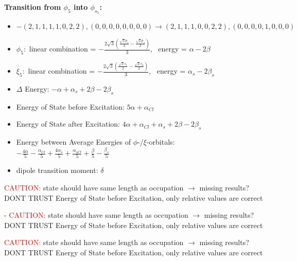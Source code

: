 \documentclass[12pt,a4paper]{article}
\begin{document}
        \noindent\textbf{Transition from $\phi_{5}$ into $\phi_{s_{5}}$:}
        \begin{itemize}
            \item $- (2, 1, 1, 1, 1, 0, 2, 2), (0, 0, 0, 0, 0, 0, 0, 0) \rightarrow (2, 1, 1, 1, 0, 0, 2, 2), (0, 0, 0, 0, 1, 0, 0, 0)$
        
            \item $\phi_{5}:$ linear combination = $- \frac{2 \sqrt{3} \left(\frac{\sqrt{2} p_{1}}{2} - \frac{\sqrt{2} p_{4}}{2}\right)}{3}$, \
            energy = $\alpha - 2 \beta$
            
            \item $\xi_{5}:$ linear combination = $- \frac{2 \sqrt{3} \left(\frac{\sqrt{2} s_{1}}{2} - \frac{\sqrt{2} s_{4}}{2}\right)}{3}$, \
            energy = $\alpha_{s} - 2 \beta_{s}$
            
            \item $\Delta$ Energy: $- \alpha + \alpha_{s} + 2 \beta - 2 \beta_{s}$
            \item Energy of State before Excitation: $5 \alpha + \alpha_{Cl}$
            \item Energy of State after Excitation: $4 \alpha + \alpha_{Cl} + \alpha_{s} + 2 \beta - 2 \beta_{s}$
            \item Energy between Average Energies of $\phi$-/$\xi$-orbitals: \
            $- \frac{4 \alpha}{5} - \frac{\alpha_{Cl}}{5} + \frac{4 \alpha_{s}}{5} + \frac{\alpha_{s Cl}}{5} + \frac{\beta}{5} - \frac{\beta_{s}}{5}$
        
            \item dipole transition moment: $\delta$
        
        \end{itemize}
        
	\textcolor{red}{CAUTION:} state should have same length as occupation $\rightarrow$ missing results?
	DONT TRUST \glqq{}Energy of State before Excitation\grqq{}, only relative values are correct

 - 	\textcolor{red}{CAUTION:} state should have same length as occupation $\rightarrow$ missing results?
	DONT TRUST \glqq{}Energy of State before Excitation\grqq{}, only relative values are correct

	\textcolor{red}{CAUTION:} state should have same length as occupation $\rightarrow$ missing results?
	DONT TRUST \glqq{}Energy of State before Excitation\grqq{}, only relative values are correct
\end{document}
